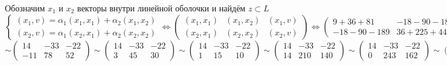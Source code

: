 \documentclass{article}
\begin{document}
\begin{center}
    Обозначим $x_1$ и $x_2$ векторы внутри линейной оболочки и найдём $z \subset L$
    $$\begin{cases}
            (x_1, v) = \alpha_1 (x_1, x_1) + \alpha_2 (x_1, x_2) \\
            (x_2, v) = \alpha_1 (x_2, x_1) + \alpha_2 (x_2, x_2)
        \end{cases} \Leftrightarrow \left( \begin{array}{cc|c}
                (x_1, x_1) & (x_1, x_2) & (x_1, v) \\
                (x_2, x_1) & (x_2, x_2) & (x_2, v)
            \end{array} \right) \Leftrightarrow \left( \begin{array}{cc|c}
                9+36+81    & -18-90-189 & -9-54-135  \\
                -18-90-189 & 36+225+441 & 18+135+315
            \end{array} \right) \Leftrightarrow \left( \begin{array}{cc|c}
                126  & -297 & -198 \\
                -297 & 702  & 468
            \end{array} \right) \sim$$
    $$\sim \left( \begin{array}{cc|c}
                14  & -33 & -22 \\
                -11 & 78  & 52
            \end{array} \right) \sim \left( \begin{array}{cc|c}
                14 & -33 & -22 \\
                3  & 45  & 30
            \end{array} \right) \sim \left( \begin{array}{cc|c}
                14 & -33 & -22 \\
                1  & 15  & 10
            \end{array} \right) \sim \left( \begin{array}{cc|c}
                14 & -33 & -22 \\
                14 & 210 & 140
            \end{array} \right) \sim \left( \begin{array}{cc|c}
                14 & -33 & -22 \\
                0  & 243 & 162
            \end{array} \right) \sim \left( \begin{array}{cc|c}

\end{array}$$
\end{center}
\end{document}
